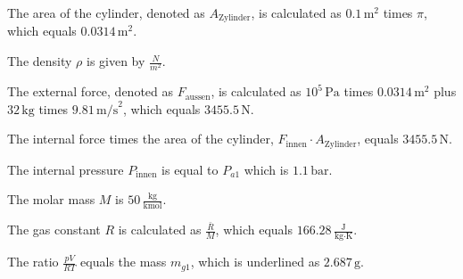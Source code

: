 The area of the cylinder, denoted as \( A_{\text{Zylinder}} \), is calculated as \( 0.1 \, \text{m}^2 \) times \( \pi \), which equals \( 0.0314 \, \text{m}^2 \).

The density \( \rho \) is given by \( \frac{N}{m^2} \).

The external force, denoted as \( F_{\text{aussen}} \), is calculated as \( 10^5 \, \text{Pa} \) times \( 0.0314 \, \text{m}^2 \) plus \( 32 \, \text{kg} \) times \( 9.81 \, \text{m/s}^2 \), which equals \( 3455.5 \, \text{N} \).

The internal force times the area of the cylinder, \( F_{\text{innen}} \cdot A_{\text{Zylinder}} \), equals \( 3455.5 \, \text{N} \).

The internal pressure \( P_{\text{innen}} \) is equal to \( P_{a1} \) which is \( 1.1 \, \text{bar} \).

The molar mass \( M \) is \( 50 \, \frac{\text{kg}}{\text{kmol}} \).

The gas constant \( R \) is calculated as \( \frac{\bar{R}}{M} \), which equals \( 166.28 \, \frac{\text{J}}{\text{kg} \cdot \text{K}} \).

The ratio \( \frac{pV}{RT} \) equals the mass \( m_{g1} \), which is underlined as \( 2.687 \, \text{g} \).